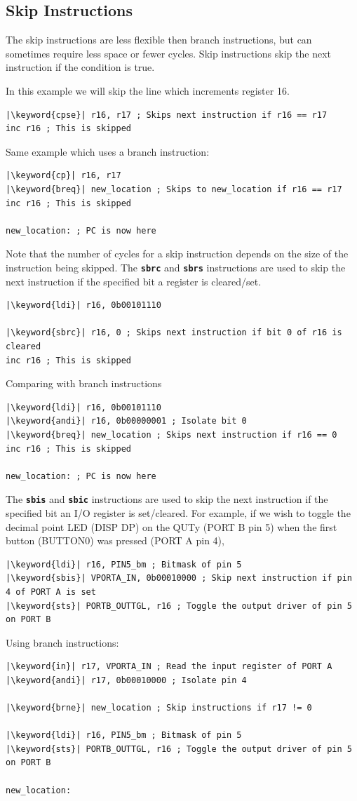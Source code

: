 \documentclass[a4paper]{report}
\newcommand{\keyword}[1]{\textcolor[rgb]{0.00,0.50,0.00}{\textbf{#1}}}
\newcommand{\keywordinline}[1]{\textcolor[rgb]{0.00,0.50,0.00}{\textbf{\texttt{#1}}}}
\begin{document}
\subsection{Skip Instructions}
The skip instructions are less flexible then branch instructions, but can sometimes require less space or fewer cycles.
Skip instructions skip the next instruction if the condition is true.

In this example we will skip the line which increments register 16.
\begin{verbatim}
|\keyword{cpse}| r16, r17 ; Skips next instruction if r16 == r17
inc r16 ; This is skipped
\end{verbatim}
Same example which uses a branch instruction:
\begin{verbatim}
|\keyword{cp}| r16, r17
|\keyword{breq}| new_location ; Skips to new_location if r16 == r17
inc r16 ; This is skipped

new_location: ; PC is now here
\end{verbatim}
Note that the number of cycles for a skip instruction depends on the size of the instruction being skipped.
The \keywordinline{sbrc} and \keywordinline{sbrs} instructions are used to skip the next instruction if the specified bit a register is cleared/set.
\begin{verbatim}
|\keyword{ldi}| r16, 0b00101110

|\keyword{sbrc}| r16, 0 ; Skips next instruction if bit 0 of r16 is cleared
inc r16 ; This is skipped
\end{verbatim}
Comparing with branch instructions
\begin{verbatim}
|\keyword{ldi}| r16, 0b00101110
|\keyword{andi}| r16, 0b00000001 ; Isolate bit 0
|\keyword{breq}| new_location ; Skips next instruction if r16 == 0
inc r16 ; This is skipped

new_location: ; PC is now here
\end{verbatim}
The \keywordinline{sbis} and \keywordinline{sbic} instructions are used to skip the next instruction if the specified bit an I/O register is set/cleared.
For example, if we wish to toggle the decimal point LED (DISP DP) on the QUTy (PORT B pin 5) when the first button (BUTTON0) was pressed (PORT A pin 4),
\begin{verbatim}
|\keyword{ldi}| r16, PIN5_bm ; Bitmask of pin 5
|\keyword{sbis}| VPORTA_IN, 0b00010000 ; Skip next instruction if pin 4 of PORT A is set
|\keyword{sts}| PORTB_OUTTGL, r16 ; Toggle the output driver of pin 5 on PORT B
\end{verbatim}
Using branch instructions:
\begin{verbatim}
|\keyword{in}| r17, VPORTA_IN ; Read the input register of PORT A
|\keyword{andi}| r17, 0b00010000 ; Isolate pin 4

|\keyword{brne}| new_location ; Skip instructions if r17 != 0

|\keyword{ldi}| r16, PIN5_bm ; Bitmask of pin 5
|\keyword{sts}| PORTB_OUTTGL, r16 ; Toggle the output driver of pin 5 on PORT B

new_location:
\end{verbatim}
\end{document}
